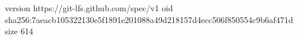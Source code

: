 version https://git-lfs.github.com/spec/v1
oid sha256:7aeacb105322130e5f1891e201088a49d218157d4ecc506f850554c9b6af471d
size 614
